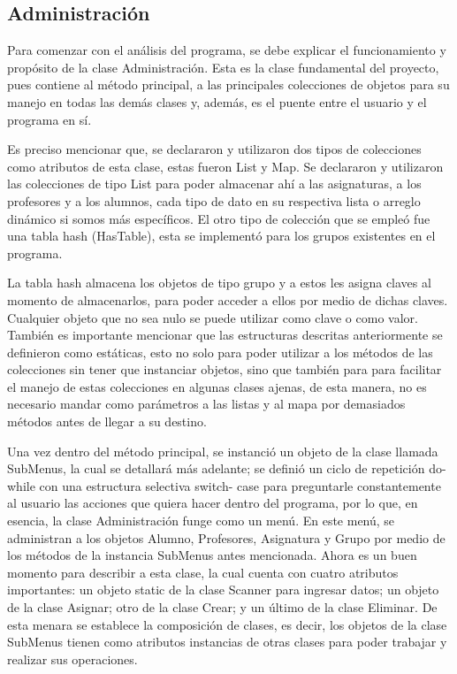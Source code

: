 \documentclass[11pt]{article}
\begin{document}
\subsection{Administración}
\par
Para comenzar con el análisis del programa, se debe explicar el 
funcionamiento y propósito de la clase Administración. Esta es la 
clase fundamental del proyecto, pues contiene al método principal, a 
las principales colecciones de objetos para su manejo en todas las 
demás clases y, además, es el puente entre el usuario y el programa 
en sí.
\par
Es preciso mencionar que, se declararon y utilizaron dos tipos 
de colecciones como atributos de esta clase, estas fueron List y Map. 
Se declararon y utilizaron las colecciones de tipo List para poder 
almacenar ahí a las asignaturas, a los profesores y a los alumnos, 
cada tipo de dato en su respectiva lista o arreglo dinámico si somos 
más específicos. El otro tipo de colección que se empleó fue una 
tabla hash (HasTable), esta se implementó para los grupos existentes 
en el programa. 
\par
La tabla hash almacena los objetos de tipo grupo y a 
estos les asigna claves al momento de almacenarlos, para poder 
acceder a ellos por medio de dichas claves. Cualquier objeto que no 
sea nulo se puede utilizar como clave o como valor. También es 
importante mencionar que las estructuras descritas anteriormente se 
definieron como estáticas, esto no solo para poder utilizar a los 
métodos de las colecciones sin tener que instanciar objetos, sino que 
también para para facilitar el manejo de estas colecciones en algunas 
clases ajenas, de esta manera, no es necesario mandar como parámetros 
a las listas y al mapa por demasiados métodos antes de llegar a su 
destino. 
\par
Una vez dentro del método principal, se instanció un objeto de la 
clase llamada SubMenus, la cual se detallará más adelante; se definió 
un ciclo de repetición do-while con una estructura selectiva switch-
case para preguntarle constantemente al usuario las acciones que 
quiera hacer dentro del programa, por lo que, en esencia, la clase 
Administración funge como un menú. En este menú, se administran a los 
objetos Alumno, Profesores, Asignatura y Grupo por medio de los 
métodos de la instancia SubMenus antes mencionada. Ahora es un buen 
momento para describir a esta clase, la cual cuenta con cuatro 
atributos importantes: un objeto static de la clase Scanner para 
ingresar datos; un objeto de la clase Asignar; otro de la clase 
Crear; y un último de la clase Eliminar. De esta menara se establece 
la composición de clases, es decir, los objetos de la clase SubMenus 
tienen como atributos instancias de otras clases para poder trabajar 
y realizar sus operaciones. 
\end{document}
